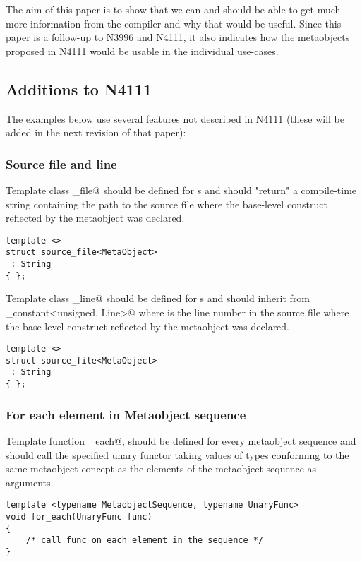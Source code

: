 The aim of this paper is to show that we can and should be able to get much more
information from the compiler and why that would be useful. Since this paper is a follow-up
to N3996 and N4111, it also indicates how the metaobjects proposed in N4111 would
be usable in the individual use-cases.

\subsection{Additions to N4111}

The examples below use several features not described in N4111 (these will be added
in the next revision of that paper):

\subsubsection{Source file and line}

Template class \verb@source_file@ should be defined for s
and should "return" a compile-time string containing the path to the source file
where the base-level construct reflected by the metaobject was declared.

\begin{verbatim}
template <>
struct source_file<MetaObject>
 : String
{ };
\end{verbatim}

Template class \verb@source_line@ should be defined for s
and should inherit from \verb@integral_constant<unsigned, Line>@ where
\verb@Line@ is the line number in the source file
where the base-level construct reflected by the metaobject was declared.

\begin{verbatim}
template <>
struct source_file<MetaObject>
 : String
{ };
\end{verbatim}

\subsubsection{For each element in Metaobject sequence}

Template function \verb@for_each@, should be defined for every metaobject sequence
and should call the specified unary functor taking values of types conforming to
the same metaobject concept as the elements of the metaobject sequence as arguments.

\begin{verbatim}
template <typename MetaobjectSequence, typename UnaryFunc>
void for_each(UnaryFunc func)
{
	/* call func on each element in the sequence */
}
\end{verbatim}

